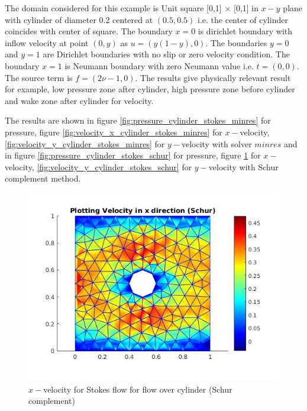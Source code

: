 \documentclass[a4paper,12pt]{book}
\begin{document}
The domain considered for this example is Unit square [0,1] $\times$ [0,1] in $x-y$ plane with cylinder of diameter 0.2 centered at $(0.5,0.5)$ i.e. the center of cylinder coincides with center of square. The boundary ${x=0}$ is dirichlet boundary with inflow velocity at point $(0,y)$ as $u = (y(1-y), 0)$. The boundaries ${y = 0}$ and ${y = 1}$ are Dirichlet boundaries with no slip or zero velocity condition. The boundary ${x = 1}$ is Neumann boundary with zero Neumann value i.e. $t = (0, 0)$. The source term is $f = (2 \nu - 1, 0)$. The results give physically relevant result for example, low pressure zone after cylinder, high pressure zone before cylinder and wake zone after cylinder for velocity.

The results are shown in figure \ref{fig:pressure_cylinder_stokes_minres} for pressure, figure \ref{fig:velocity_x_cylinder_stokes_minres} for $x-$velocity, \ref{fig:velocity_y_cylinder_stokes_minres} for $y-$velocity with solver $minres$ and in figure \ref{fig:pressure_cylinder_stokes_schur} for pressure, figure \ref{fig:velocity_x_cylinder_stokes_schur} for $x-$velocity, \ref{fig:velocity_y_cylinder_stokes_schur} for $y-$velocity with Schur complement method.

\begin{figure}
  \includegraphics[width=\linewidth]{velocity_X_schur.jpg}
  \caption{$x-$velocity for Stokes flow for flow over cylinder (Schur complement)}
  \label{fig:velocity_x_cylinder_stokes_schur}
\end{figure}
\end{document}
